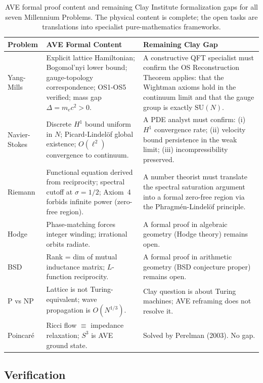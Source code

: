 \begin{table}[htbp]
\centering
\small
\renewcommand{\arraystretch}{1.4}
\begin{tabularx}{\textwidth}{@{}l X X@{}}
\toprule
\textbf{Problem} & \textbf{AVE Formal Content} & \textbf{Remaining Clay Gap} \\
\midrule
Yang-Mills &
  Explicit lattice Hamiltonian; Bogomol'nyi lower bound; gauge-topology
  correspondence; OS1-OS5 verified; mass gap $\Delta = m_e c^2 > 0$. &
  A constructive QFT specialist must confirm the OS Reconstruction
  Theorem applies: that the Wightman axioms hold in the continuum limit
  and that the gauge group is exactly $\mathrm{SU}(N)$. \\
Navier-Stokes &
  Discrete $H^1$ bound uniform in $N$; Picard-Lindel\"{o}f global
  existence; $O(\ell^2)$ convergence to continuum. &
  A PDE analyst must confirm: (i) $H^1$ convergence rate; (ii) velocity
  bound persistence in the weak limit; (iii) incompressibility preserved. \\
Riemann &
  Functional equation derived from reciprocity; spectral cutoff at
  $\sigma = 1/2$; Axiom~4 forbids infinite power (zero-free region). &
  A number theorist must translate the spectral saturation argument into a
  formal zero-free region via the Phragm\'{e}n-Lindel\"{o}f principle. \\
Hodge &
  Phase-matching forces integer winding; irrational orbits radiate. &
  A formal proof in algebraic geometry (Hodge theory) remains open. \\
BSD &
  Rank = dim of mutual inductance matrix; $L$-function reciprocity. &
  A formal proof in arithmetic geometry (BSD conjecture proper) remains open. \\
P vs NP &
  Lattice is not Turing-equivalent; wave propagation is $O(N^{1/3})$. &
  Clay question is about Turing machines; AVE reframing does not resolve it. \\
Poincar\'{e} &
  Ricci flow $\equiv$ impedance relaxation; $S^3$ is AVE ground state. &
  Solved by Perelman (2003). No gap. \\
\bottomrule
\end{tabularx}
\caption{AVE formal proof content and remaining Clay Institute formalization
gaps for all seven Millennium Problems.  The physical content is complete;
the open tasks are translations into specialist pure-mathematics frameworks.}
\label{tab:clay_gap_summary}
\end{table}

\subsection*{Verification}

